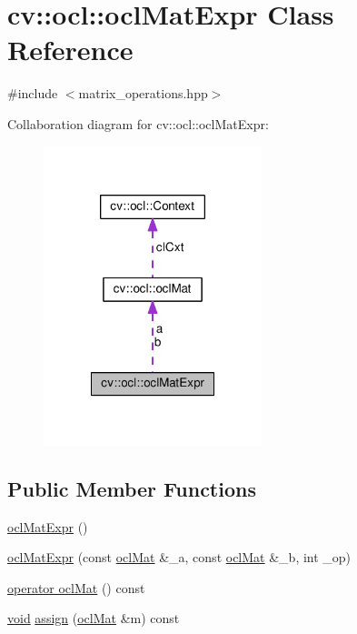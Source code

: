 \hypertarget{classcv_1_1ocl_1_1oclMatExpr}{\section{cv\-:\-:ocl\-:\-:ocl\-Mat\-Expr Class Reference}
\label{classcv_1_1ocl_1_1oclMatExpr}
}


{\ttfamily \#include $<$matrix\-\_\-operations.\-hpp$>$}



Collaboration diagram for cv\-:\-:ocl\-:\-:ocl\-Mat\-Expr\-:\nopagebreak
\begin{figure}[H]
\begin{center}
\leavevmode
\includegraphics[width=180pt]{classcv_1_1ocl_1_1oclMatExpr__coll__graph}
\end{center}
\end{figure}
\subsection*{Public Member Functions}
\begin{DoxyCompactItemize}
\item 
\hyperlink{classcv_1_1ocl_1_1oclMatExpr_aac1b3d175713e2d7ad55bc8f291298b4}{ocl\-Mat\-Expr} ()
\item 
\hyperlink{classcv_1_1ocl_1_1oclMatExpr_a9925f9aebedec46e6e89997f3a34ffd4}{ocl\-Mat\-Expr} (const \hyperlink{classcv_1_1ocl_1_1oclMat}{ocl\-Mat} \&\-\_\-a, const \hyperlink{classcv_1_1ocl_1_1oclMat}{ocl\-Mat} \&\-\_\-b, int \-\_\-op)
\item 
\hyperlink{classcv_1_1ocl_1_1oclMatExpr_ae59fd10d90e5317a1918515f3327a709}{operator ocl\-Mat} () const 
\item 
\hyperlink{legacy_8hpp_a8bb47f092d473522721002c86c13b94e}{void} \hyperlink{classcv_1_1ocl_1_1oclMatExpr_abc7724a7b7413bd1b719fefb55482a37}{assign} (\hyperlink{classcv_1_1ocl_1_1oclMat}{ocl\-Mat} \&m) const 
\end{DoxyCompactItemize}
